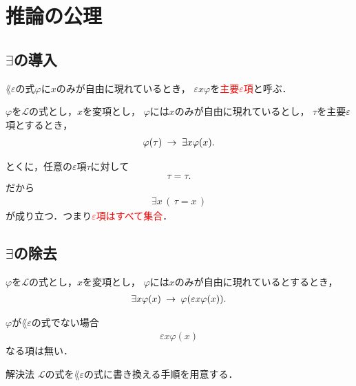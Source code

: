 \section{推論の公理}
\subsection{$\exists$の導入}
	$\lang{\varepsilon}$の式$\varphi$に$x$のみが自由に現れているとき，
	$\varepsilon x \varphi$を\textcolor{red}{主要$\varepsilon$項}と呼ぶ．
	
	\begin{screen}
		\begin{logicalaxm}
			$\varphi$を$\mathcal{L}$の式とし，$x$を変項とし，
			$\varphi$には$x$のみが自由に現れているとし，
			$\tau$を主要$\varepsilon$項とするとき，
			\begin{align}
				\varphi(\tau) \hspace{0.25em}\rightarrow\hspace{0.25em} \exists x \varphi(x).
			\end{align}
		\end{logicalaxm}
	\end{screen}
	
	とくに，任意の$\varepsilon$項$\tau$に対して
	\begin{align}
		\tau = \tau.
	\end{align}
	だから
	\begin{align}
		\exists x\, (\, \tau = x\, )
	\end{align}
	が成り立つ．つまり\textcolor{red}{$\varepsilon$項はすべて集合}．
	
\newpage
\subsection{$\exists$の除去}
	\begin{screen}
		\begin{logicalaxm}
			$\varphi$を$\mathcal{L}$の式とし，$x$を変項とし，
			$\varphi$には$x$のみが自由に現れているとするとき，
			\begin{align}
				\exists x \varphi(x) \hspace{0.25em}\rightarrow\hspace{0.25em} \varphi(\varepsilon x \varphi(x)).
			\end{align}
		\end{logicalaxm}
	\end{screen}
	
	$\varphi$が$\lang{\varepsilon}$の式でない場合
	\begin{align}
		\varepsilon x \varphi(x)
	\end{align}
	なる項は無い．
	
	\begin{itembox}[l]{解決法}
		$\mathcal{L}$の式を$\lang{\varepsilon}$の式に書き換える手順を用意する．
	\end{itembox}

